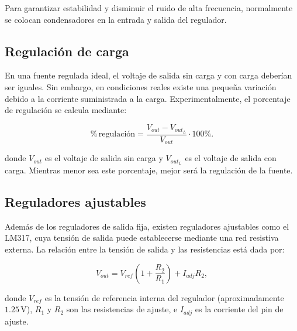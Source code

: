 \documentclass[12pt,a4paper]{article}
\begin{document}
Para garantizar estabilidad y disminuir el ruido de alta frecuencia, normalmente se colocan condensadores en la entrada y salida del regulador.

\subsection{Regulación de carga}

En una fuente regulada ideal, el voltaje de salida sin carga y con carga deberían ser iguales. Sin embargo, en condiciones reales existe una pequeña variación debido a la corriente suministrada a la carga. Experimentalmente, el porcentaje de regulación se calcula mediante:

\begin{equation}
\%\,\text{regulación}=
\frac{V_{out}-V_{out_L}}{V_{out}}\cdot100\%.
\label{eq:regulacion}
\end{equation}

donde $V_{out}$ es el voltaje de salida sin carga y $V_{out_L}$ es el voltaje de salida con carga. Mientras menor sea este porcentaje, mejor será la regulación de la fuente.

\subsection{Reguladores ajustables}

Además de los reguladores de salida fija, existen reguladores ajustables como el LM317, cuya tensión de salida puede establecerse mediante una red resistiva externa. La relación entre la tensión de salida y las resistencias está dada por:

\begin{equation}
V_{out}=V_{ref}\left(1+\frac{R_2}{R_1}\right)+I_{adj}R_2,
\label{eq:voltaje_salida}
\end{equation}

donde $V_{ref}$ es la tensión de referencia interna del regulador (aproximadamente $1.25\,\text{V}$), $R_1$ y $R_2$ son las resistencias de ajuste, e $I_{adj}$ es la corriente del pin de ajuste.
\end{document}
